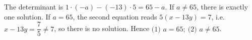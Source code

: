 The determinant is $1\cdot(-a)-(-13)\cdot5=65-a$. If $a\ne65$, there is exactly one solution. If $a=65$, the second equation reads $5(x-13y)=7$, i.e. $x-13y=\dfrac75\ne7$, so there is no solution. Hence $\boxed{\text{(1) }a=65;\ \text{(2) }a\ne65}$.
